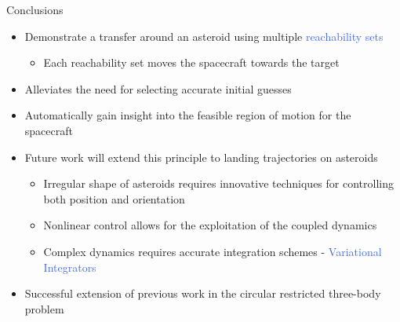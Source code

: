 \documentclass[final, usenames, dvipsnames]{beamer}
\newlength{\onecolwidth}
\def\Emph{\textcolor{RoyalBlue}}
\begin{document}
\begin{frame}[t]
\begin{columns}[T]
\begin{column}{\onecolwidth}
\begin{block}{Conclusions} %
	\begin{itemize}
		\item Demonstrate a transfer around an asteroid using multiple \Emph{reachability sets}
        \begin{itemize}
            \item Each reachability set moves the spacecraft towards the target
        \end{itemize}
        \item Alleviates the need for selecting accurate initial guesses 
		\item Automatically gain insight into the feasible region of motion for the spacecraft
        \item Future work will extend this principle to landing trajectories on asteroids
        \begin{itemize}
            \item Irregular shape of asteroids requires innovative techniques for controlling both position and orientation
            \item Nonlinear control allows for the exploitation of the coupled dynamics
            \item Complex dynamics requires accurate integration schemes - \Emph{Variational Integrators}
        \end{itemize}
        \item Successful extension of previous work in the circular restricted three-body problem
	\end{itemize}
    \vspace{0.4cm}
\end{block} %

\end{column}  %

\end{columns} %
\vfill
\end{frame} %
\end{document}
